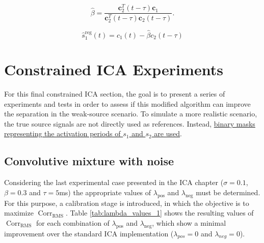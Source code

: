 \begin{equation}
    \hat{\beta} =
    \frac{\mathbf{c}_2^T(t-\tau) \mathbf{c}_1}
    {\mathbf{c}_2^T (t-\tau)\mathbf{c}_2 (t-\tau)} .
    \label{eq:regression_beta_with_tau}
\end{equation}

\begin{equation}
    \hat{s}_1^{\mathrm{reg}}(t) =
    c_1(t) - \hat{\beta}c_2(t-\tau)
    \label{eq:regression_s1_with_tau}
\end{equation}
\clearpage

\section{Constrained ICA Experiments }

For this final constrained ICA section, the goal is to present a series of experiments and tests in order to assess if this modified algorithm can improve the separation in the weak-source scenario. To simulate a more realistic scenario, the true source signals are not directly used as references. Instead, \uline{binary masks representing the activation periods of $s_1$ and $s_2$ are used}. 

\subsection{Convolutive mixture with noise}

Considering the last experimental case presented in the ICA chapter ($\sigma=0.1$, $\beta=0.3$ and $\tau=5$ms) the appropriate values of $\lambda_{\mathrm{pos}}$ and $\lambda_{\mathrm{neg}}$ must be determined. For this purpose, a calibration stage is introduced, in which the objective is to maximize $\operatorname{Corr}_{\mathrm{RMS}}$. Table \ref{tab:lambda_values_1} shows the resulting values of $\operatorname{Corr}_{\mathrm{RMS}}$ for each combination of $\lambda_{\mathrm{pos}}$ and $\lambda_{\mathrm{neg}}$, which show a minimal improvement over the standard ICA implementation ($\lambda_{pos}=0$ and $\lambda_{neg}=0$). 

